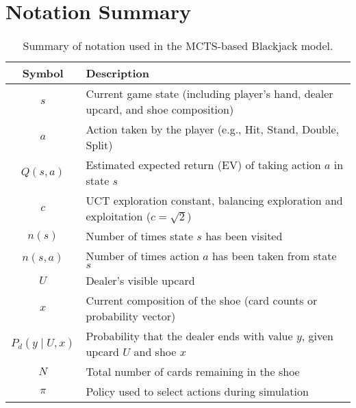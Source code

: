 \documentclass[12pt,a4paper]{cibb}
\begin{document}
\section{Notation Summary}

\begin{table}[H]
\centering
\renewcommand{\arraystretch}{1.3}
\begin{tabular}{|c|p{10cm}|}
\hline
\textbf{Symbol} & \textbf{Description} \\
\hline
$s$ & Current game state (including player's hand, dealer upcard, and shoe composition) \\
$a$ & Action taken by the player (e.g., Hit, Stand, Double, Split) \\
$Q(s, a)$ & Estimated expected return (EV) of taking action $a$ in state $s$ \\
$c$ & UCT exploration constant, balancing exploration and exploitation ($c = \sqrt{2}$) \\
$n(s)$ & Number of times state $s$ has been visited \\
$n(s, a)$ & Number of times action $a$ has been taken from state $s$ \\
$U$ & Dealer's visible upcard \\
$x$ & Current composition of the shoe (card counts or probability vector) \\
$P_d(y \mid U, x)$ & Probability that the dealer ends with value $y$, given upcard $U$ and shoe $x$ \\
$N$ & Total number of cards remaining in the shoe\\
$\pi$ & Policy used to select actions during simulation\\
\hline
\end{tabular}
\caption{Summary of notation used in the MCTS-based Blackjack model.}
\label{tab:notation}
\end{table}

\footnotesize

 
\normalsize
\end{document}
